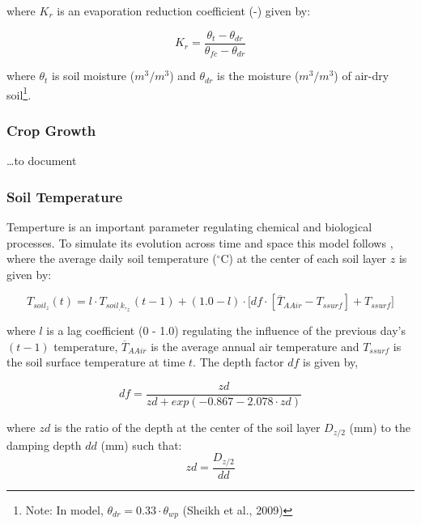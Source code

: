 \documentclass[]{article}
\let\rmarkdownfootnote\footnote%
\def\footnote{\protect\rmarkdownfootnote}
\begin{document}
where \(K_r\) is an evaporation reduction coefficient (-) given by:

\begin{equation}
K_r = \frac{ \theta_t - \theta_{dr} }{ \theta_{fc} - \theta_{dr} }
\label{eq:Kr}  
\end{equation}

where \(\theta_t\) is soil moisture (\(m^3/m^3\)) and \(\theta_{dr}\) is
the moisture (\(m^3/m^3\)) of air-dry
soil\footnote{Note: In model, $\theta_{dr} = 0.33 \cdot \theta_{wp}$ (Sheikh et al., 2009)}.

\hypertarget{crop-growth}{%
\subsubsection{Crop Growth}\label{crop-growth}}

\ldots{}to document

\hypertarget{soil-temperature}{%
\subsubsection{Soil Temperature}\label{soil-temperature}}

Temperture is an important parameter regulating chemical and biological
processes. To simulate its evolution across time and space this model
follows \citep{Neitsch2009}, where the average daily soil temperature
(\(^{\circ}\)C) at the center of each soil layer \(z\) is given by:

\begin{equation}
T_{soil_z}(t) = l \cdot T_{soil_, k,_z}(t-1) + (1.0 - l) \cdot \big[df \cdot [\overline{T}_{AAir} - T_{ssurf}]+T_{ssurf}]
\label{eq:tempSoil} 
\end{equation}

where \(l\) is a lag coefficient (0 - 1.0) regulating the influence of
the previous day's \((t-1)\) temperature, \(\overline{T}_{AAir}\) is the
average annual air temperature and \(T_{ssurf}\) is the soil surface
temperature at time \(t\). The depth factor \(df\) is given by,

\begin{equation}
df = \frac{zd}{zd+exp(-0.867-2.078 \cdot zd)}
\label{eq:df} 
\end{equation}

where \(zd\) is the ratio of the depth at the center of the soil layer
\(D_{z/2}\) (mm) to the damping depth \(dd\) (mm) such that:
\begin{equation}
zd = \frac{D_{z/2}}{dd}
\label{eq:zd} 
\end{equation}
\end{document}
